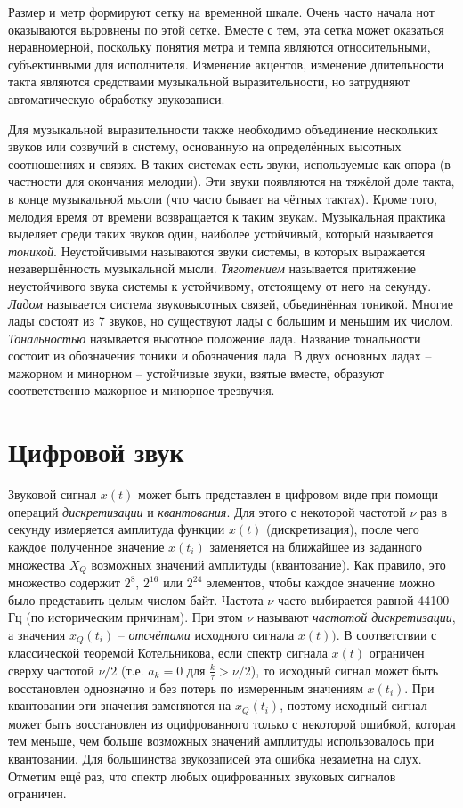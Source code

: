 Размер и метр формируют сетку на временной шкале. Очень часто начала нот
оказываются выровнены по этой сетке. Вместе с тем, эта сетка может оказаться
неравномерной, поскольку понятия метра и темпа являются относительными,
субъектинвыми для исполнителя. Изменение акцентов, изменение длительности такта
являются средствами музыкальной выразительности, но затрудняют автоматическую
обработку звукозаписи.

Для музыкальной выразительности также необходимо объединение нескольких звуков
или созвучий в систему, основанную на определённых высотных соотношениях и
связях. В таких системах есть звуки, используемые как опора (в частности для
окончания мелодии). Эти звуки появляются на тяжёлой доле такта, в конце
музыкальной мысли (что часто бывает на чётных тактах). Кроме того, мелодия время
от времени возвращается к таким звукам. Музыкальная практика выделяет среди
таких звуков один, наиболее устойчивый, который называется \emph{тоникой}.
Неустойчивыми называются звуки системы, в которых выражается незавершённость
музыкальной мысли. \emph{Тяготением} называется притяжение неустойчивого звука
системы к устойчивому, отстоящему от него на секунду. \emph{Ладом} называется
система звуковысотных связей, объединённая тоникой. Многие лады состоят из 7
звуков, но существуют лады с большим и меньшим их числом. \emph{Тональностью}
называется высотное положение лада. Название тональности состоит из обозначения
тоники и обозначения лада. В двух основных ладах -- мажорном и минорном --
устойчивые звуки, взятые вместе, образуют соответственно мажорное и минорное
трезвучия.

\section{Цифровой звук} \label{sectT_digit}

Звуковой сигнал $x(t)$ может быть представлен в цифровом виде при помощи
операций \emph{дискретизации} и \emph{квантования}. Для этого с некоторой
частотой $\nu$ раз в секунду измеряется амплитуда функции $x(t)$
(дискретизация), после чего каждое полученное значение $x(t_i)$ заменяется на
ближайшее из заданного множества $X_Q$ возможных значений амплитуды
(квантование). Как правило, это множество содержит $2^8$, $2^{16}$ или $2^{24}$
элементов, чтобы каждое значение можно было представить целым числом байт.
Частота $\nu$ часто выбирается равной 44100 Гц (по историческим причинам). При
этом $\nu$ называют \emph{частотой дискретизации}, а значения $x_Q(t_i)$ --
\emph{отсчётами} исходного сигнала $x(t))$. В соответствии с классической
теоремой Котельникова, если спектр сигнала $x(t)$ ограничен сверху частотой
$\nu/2$ (т.е. $a_k = 0$ для $\frac{k}{\tau} > \nu/2$), то исходный сигнал может
быть восстановлен однозначно и без потерь по измеренным значениям $x(t_i)$. При
квантовании эти значения заменяются на $x_Q(t_i)$, поэтому исходный сигнал может
быть восстановлен из оцифрованного только с некоторой ошибкой, которая тем
меньше, чем больше возможных значений амплитуды использовалось при квантовании.
Для большинства звукозаписей эта ошибка незаметна на слух. Отметим ещё раз, что
спектр любых оцифрованных звуковых сигналов ограничен.

